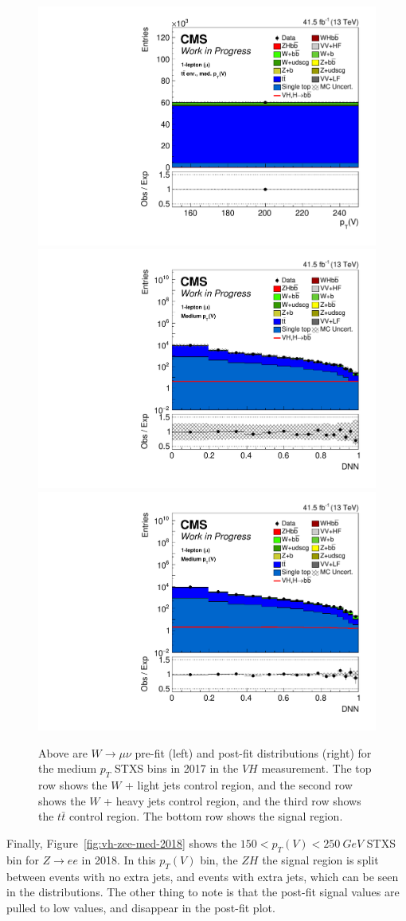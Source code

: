 \begin{figure}
  \includegraphics[width=0.35\linewidth]{figures/210322_STXSfine_400split_unblinded_Xbb_025349b6_postfitplots/plot_shapes_vhbb_Wmn_8_13TeV2017_postfit.pdf} \\
  \includegraphics[width=0.35\linewidth]{figures/210322_STXSfine_400split_unblinded_Xbb_025349b6_postfitplots/plot_shapes_vhbb_Wmn_5_13TeV2017_prefit_logy.pdf}
  \includegraphics[width=0.35\linewidth]{figures/210322_STXSfine_400split_unblinded_Xbb_025349b6_postfitplots/plot_shapes_vhbb_Wmn_5_13TeV2017_postfit_logy.pdf} \\
  \caption[$W\rightarrow \mu\nu$ $V\!H$ distributions for medium $p_T$ in 2017]{
    Above are $W\rightarrow \mu\nu$ pre-fit (left) and post-fit distributions (right)
    for the medium $p_T$ STXS bins in 2017 in the $V\!H$ measurement.
    The top row shows the $W$ + light jets control region, and
    the second row shows the $W$ + heavy jets control region, and
    the third row shows the $t\bar{t}$ control region.
    The bottom row shows the signal region.
  }
  \label{fig:vh-wmn-med-2017}
\end{figure}
%
Finally, Figure~\ref{fig:vh-zee-med-2018} shows the $150 < p_T(V) < \SI{250}{GeV}$ STXS bin
for $Z\rightarrow ee$ in 2018.
In this $p_T(V)$ bin, the $Z\!H$ the signal region is split between events with no extra jets,
and events with extra jets, which can be seen in the distributions.
The other thing to note is that the post-fit signal values are pulled to low values,
and disappear in the post-fit plot.
